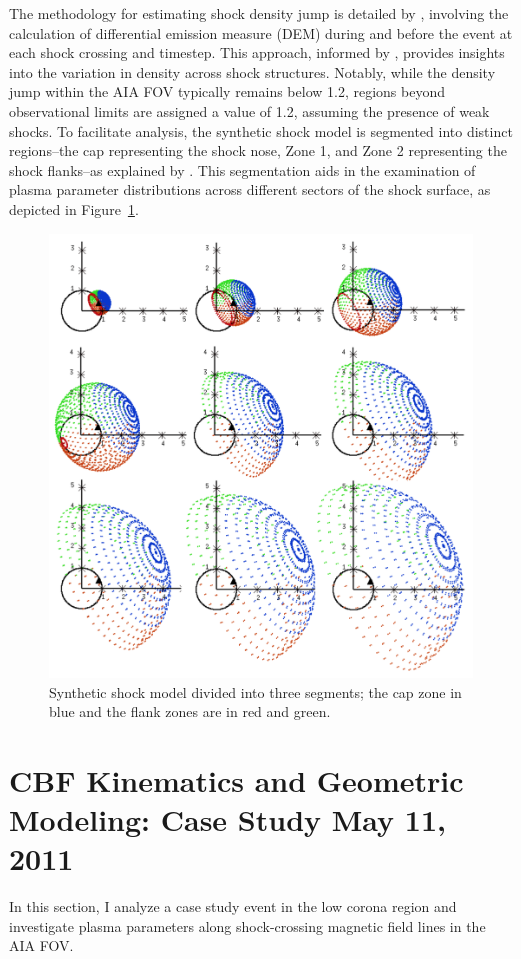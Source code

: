 The methodology for estimating shock density jump is detailed by \citet{kozarev_2017}, involving the calculation of differential emission measure (DEM) during and before the event at each shock crossing and timestep. This approach, informed by \citet{cheung_2015}, provides insights into the variation in density across shock structures. Notably, while the density jump within the AIA FOV typically remains below 1.2, regions beyond observational limits are assigned a value of 1.2, assuming the presence of weak shocks.
To facilitate analysis, the synthetic shock model is segmented into distinct regions--the cap representing the shock nose, Zone 1, and Zone 2 representing the shock flanks--as explained by \citet{kozarev_2022}. This segmentation aids in the examination of plasma parameter distributions across different sectors of the shock surface, as depicted in Figure~\ref{fig_segments}.

\begin{figure}[!htp] %
	\centerline{\includegraphics[width=0.5\columnwidth]{chapter2/figs/fig_s2m_segments_geometry.png}}
	\caption{Synthetic shock model divided into three segments; the cap zone in blue and the flank zones are in red and green.}
	\label{fig_segments}
\end{figure}

\section{CBF Kinematics and Geometric Modeling: Case Study May 11, 2011}
In this section, I analyze a case study event in the low corona region and investigate plasma parameters along shock-crossing magnetic field lines in the AIA FOV.

